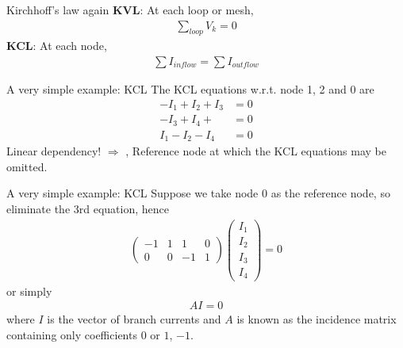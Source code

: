 \documentclass[xcolor=dvipsnames]{beamer}
\begin{document}
\begin{frame}{Kirchhoff's law again}
	\textbf{KVL}: At each loop or mesh,
	\begin{align*}
		\sum_{loop} V_k = 0
	\end{align*}
	\textbf{KCL}: At each node,
	\begin{align*}
		\sum I_{inflow} = \sum I_{outflow}
	\end{align*}

\end{frame}

\begin{frame}{A very simple example: KCL}
	The KCL equations w.r.t. node 1, 2 and 0 are
	\begin{align*}
		-I_1 + I_2 + I_3 &= 0\\
		-I_3 + I_4 + \,\, &= 0\\
		I_1 - I_2 - I_4 &=0
	\end{align*}
Linear dependency! $\Longrightarrow\,\,$, Reference node at which the KCL equations may be omitted.
\end{frame}

\begin{frame}{A very simple example: KCL}
Suppose we take node 0 as the reference node, so eliminate the 3rd equation, hence
\begin{align*}
	\begin{pmatrix} -1 & 1 & 1 & 0\\ 0 & 0 & -1 & 1 \end{pmatrix}
	\begin{pmatrix} I_1\\ I_2 \\I_3 \\I_4  \end{pmatrix} =0
\end{align*}
or simply
\begin{align*}
	A I = 0
\end{align*}
where $I$ is the vector of branch currents and $A$ is known as the {\color{purple}incidence matrix} containing only coefficients $0$ or $1$, $-1$.
\end{frame}
\end{document}
